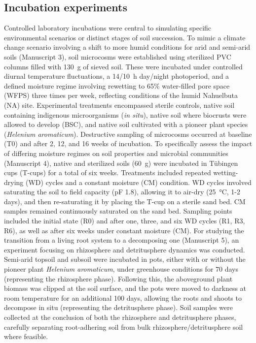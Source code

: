 \subsection{Incubation experiments}

Controlled laboratory incubations were central to simulating specific environmental scenarios or distinct stages of soil succession. To mimic a climate change scenario involving a shift to more humid conditions for arid and semi-arid soils (Manuscript 3), soil microcosms were established using sterilized PVC columns filled with \SI{130}{\gram} of sieved soil. These were incubated under controlled diurnal temperature fluctuations, a 14/\SI{10}{\hour} day/night photoperiod, and a defined moisture regime involving rewetting to 65\% water-filled pore space (WFPS) three times per week, reflecting conditions of the humid Nahuelbuta (NA) site. Experimental treatments encompassed sterile controls, native soil containing indigenous microorganisms (\textit{in situ}), native soil where biocrusts were allowed to develop (BSC), and native soil cultivated with a pioneer plant species (\textit{Helenium aromaticum}). Destructive sampling of microcosms occurred at baseline (T0) and after 2, 12, and 16 weeks of incubation. To specifically assess the impact of differing moisture regimes on soil properties and microbial communities (Manuscript 4), native and sterilized soils (\SI{60}{\gram}) were incubated in Tübingen cups (T-cups) for a total of six weeks. Treatments included repeated wetting-drying (WD) cycles and a constant moisture (CM) condition. WD cycles involved saturating the soil to field capacity (pF 1.8), allowing it to air-dry (\SI{25}{\degreeCelsius}, 1-2 days), and then re-saturating it by placing the T-cup on a sterile sand bed. CM samples remained continuously saturated on the sand bed. Sampling points included the initial state (R0) and after one, three, and six WD cycles (R1, R3, R6), as well as after six weeks under constant moisture (CM). For studying the transition from a living root system to a decomposing one (Manuscript 5), an experiment focusing on rhizosphere and detritusphere dynamics was conducted. Semi-arid topsoil and subsoil were incubated in pots, either with or without the pioneer plant \textit{Helenium aromaticum}, under greenhouse conditions for 70 days (representing the rhizosphere phase). Following this, the aboveground plant biomass was clipped at the soil surface, and the pots were moved to darkness at room temperature for an additional 100 days, allowing the roots and shoots to decompose in situ (representing the detritusphere phase). Soil samples were collected at the conclusion of both the rhizosphere and detritusphere phases, carefully separating root-adhering soil from bulk rhizosphere/detritusphere soil where feasible.

